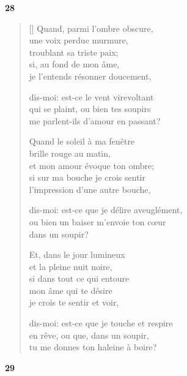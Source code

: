 \documentclass[a4paper,12pt]{book}
\begin{document}
\bigskip

\begin{center}
  \textbf{28}
\end{center}

\settowidth{\versewidth}{dis-moi: est-ce que je touche et respire}

\begin{verse}[\versewidth]
  Quand, parmi l'ombre obscure, \\
  une voix perdue murmure, \\
  troublant sa triste paix; \\
  si, au fond de mon âme, \\
  je l'entends résonner doucement,

  dis-moi: est-ce le vent virevoltant \\
  qui se plaint, ou bien tes soupirs \\
  me parlent-ils d'amour en passant?

  Quand le soleil à ma fenêtre \\
  brille rouge au matin, \\
  et mon amour évoque ton ombre; \\
  si sur ma bouche je crois sentir \\
  l'impression d'une autre bouche,

  dis-moi: est-ce que je délire aveuglément, \\
  ou bien un baiser m'envoie ton cœur \\
  dans un soupir?

  Et, dans le jour lumineux \\
  et la pleine nuit noire, \\
  si dans tout ce qui entoure \\
  mon âme qui te désire \\
  je crois te sentir et voir,

  dis-moi: est-ce que je touche et respire \\
  en rêve, ou que, dans un soupir, \\
  tu me donnes ton haleine à boire?
\end{verse}

\bigskip

\begin{center}
  \textbf{29}
\end{center}
\end{document}
